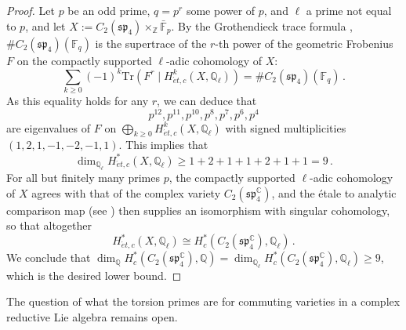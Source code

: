 \documentclass[oneside, 12pt, a4paper]{amsart}
\numberwithin{equation}{section}
\newcommand{\F}{\mathbb{F}}
\newcommand{\Z}{\mathbb{Z}}
\newcommand{\C}{\mathbb{C}}
\newcommand{\Q}{\mathbb{Q}}
\theoremstyle{plain}
\theoremstyle{definition}
\theoremstyle{remark}
\begin{document}
\begin{proof}
Let $p$ be an odd prime, $q=p^r$ some power of $p$, and $\ell$ a prime not equal to $p$, and let $X:=C_2(\mathfrak{sp}_4)\times_{\Z} \bar{\F}_p$. By the Grothendieck trace formula \cite{De77}, $\#C_2(\mathfrak{sp}_4)(\mathbb{F}_q)$ is the supertrace of the $r$-th power of the geometric Frobenius $F$ on the compactly supported $\ell$-adic cohomology of $X$:
\[
\sum_{k\geq 0} (-1)^k \mathrm{Tr}(F^r \mid H^k_{\acute{e}t,c}(X,\Q_\ell)) =\#C_2(\mathfrak{sp}_4)(\mathbb{F}_q)\, .
\]
As this equality holds for any $r$, we can deduce that 
\[
p^{12},p^{11},p^{10},p^8,p^7,p^6,p^4
\]
are eigenvalues of $F$ on $\bigoplus_{k\geq 0} H^k_{\acute{e}t,c}(X,\Q_\ell)$ with signed multiplicities $(1,2,1,-1,-2,-1,1)$. This implies that
\[
\dim_{\Q_\ell} H^\ast_{\acute{e}t,c}(X,\Q_\ell)\geq 1+2+1+1+2+1+1=9\,.
\]
For all but finitely many primes $p$, the compactly supported $\ell$-adic cohomology of $X$ agrees with that of the complex variety $C_2(\mathfrak{sp}_4^\C)$, and the étale to analytic comparison map (see \cite[Ch.~III,\S3]{Mi80}) then supplies an isomorphism with singular cohomology, so that altogether
\[H^*_{\acute{e}t,c}(X,\Q_{\ell})\cong H^*_{c}(C_2(\mathfrak{sp}^\C_4),\Q_{\ell})\, .\]
We conclude that $\dim_\Q H^\ast_c(C_2(\mathfrak{sp}_4^\C),\Q)=\dim_{\Q_\ell} H^\ast_c(C_2(\mathfrak{sp}_4^\C),\Q_{\ell})\geq 9$, which is the desired lower bound.
\end{proof}


The question of what the torsion primes are for commuting varieties in a complex reductive Lie algebra remains open.





\end{document}
